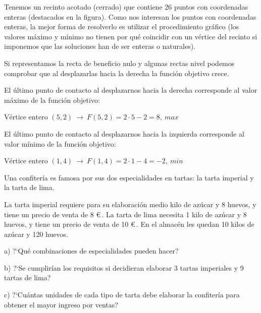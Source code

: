 Tenemos un recinto acotado (cerrado) que contiene 26 puntos con coordenadas enteras (destacados en la figura). Como nos interesan los puntos con coordenadas enteras, la mejor forma de resolverlo es utilizar el procedimiento gráfico (los valores máximo y mínimo no tienen por qué coincidir con un vértice del recinto si imponemos que las soluciones han de ser enteras o naturales).

Si representamos la recta de beneficio nulo y algunas rectas nivel  podemos comprobar que al desplazarlas hacia la derecha la función objetivo crece.

\vspace{4mm}
\begin{destacado}
El último punto de contacto al desplazarnos hacia la derecha corresponde al valor máximo de la función objetivo:

$\text{Vértice entero } (5, 2) \ \to \  F (5, 2) = 2 \cdot 5 - 2 = 8,\ max$

El último punto de contacto al desplazarnos hacia la izquierda corresponde al valor
mínimo de la función objetivo:

$\text{Vértice entero } (1, 4) \ \to \ F (1, 4) = 2 \cdot 1 - 4 = -2	,\ min$
\end{destacado}

\vspace{5mm}

\begin{ejemplo}
	\begin{ejre}
	Una confitería es famosa por sus dos especialidades en tartas: la tarta imperial y la tarta de lima.
	
La tarta imperial requiere para su elaboración medio kilo de azúcar y 8 huevos, y tiene un precio de venta de 8 \euro $\,$. La tarta de lima necesita 1 kilo de azúcar y 8 huevos, y tiene un precio de venta de 10  \euro $\,$. En el almacén les quedan 10 kilos de azúcar y 120 huevos.

\begin{adjustwidth}{10pt}{5pt}
a) ?`Qué combinaciones de especialidades pueden hacer?

b) ?`Se cumplirían los requisitos si decidieran elaborar 3 tartas imperiales y 9 tartas de lima?

c) ?`Cuántas unidades de cada tipo de tarta debe elaborar la confitería para obtener el mayor ingreso por ventas?	
\end{adjustwidth}
	\end{ejre}	
\end{ejemplo}

